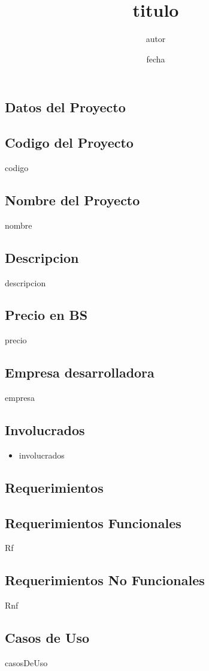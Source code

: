 \documentclass{article}
\title
{
titulo
}
\date
{
fecha
}
\author
{
autor
}
\begin{document}
\maketitle %
\newpage %
\begin{center}
\section{Datos del Proyecto}
\end{center}
\subsection{Codigo del Proyecto}
codigo
\subsection{Nombre del Proyecto}
nombre
\subsection{Descripcion}
descripcion
\subsection{Precio en BS}
precio
\subsection{Empresa desarrolladora}
empresa
\subsection{Involucrados}
\begin{itemize}
\item involucrados
\end{itemize}
\newpage 
\begin{center}
\section{Requerimientos}
\end{center}
\subsection{Requerimientos Funcionales}
Rf
\newpage %
\subsection{Requerimientos No Funcionales}
Rnf
\newpage
\begin{center}
\section{Casos de Uso}
\end{center}
casosDeUso
\end{document}
